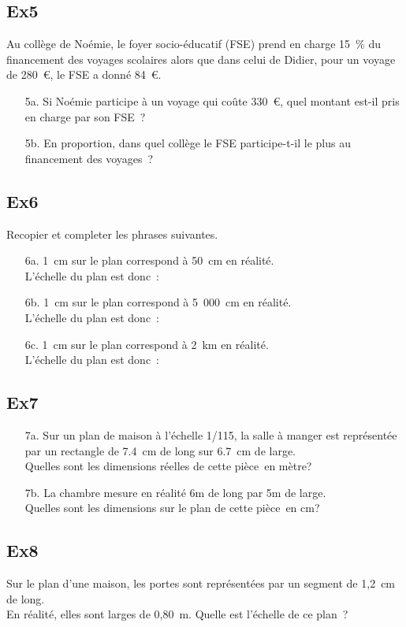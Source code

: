 \documentclass[12pt]{article}
\begin{document}
\begin{multicols}{2}
\subsection*{Ex5}
 Au collège de Noémie, le foyer socio-éducatif (FSE) prend en charge 15 \% du financement des voyages scolaires alors que dans celui de Didier, pour un voyage de 280 \euro, le FSE a donné 84 \euro.

\begin{itemize}
\item[5a.] Si Noémie participe à un voyage qui coûte 330 \euro, quel montant est-il pris en charge par son FSE ?
\item[5b.] En proportion, dans quel collège le FSE participe-t-il le plus au financement des voyages ?
\end{itemize}

\subsection*{Ex6}
Recopier et completer les phrases suivantes.
\begin{itemize}
\item[6a.] 1 cm sur le plan correspond à 50 cm en réalité.\\
L’échelle du plan est donc : 
\item[6b.] 1 cm sur le plan correspond à 5 000 cm en réalité. \\
L’échelle du plan est donc : 
\item[6c.] 1 cm sur le plan correspond à 2 km en réalité.\\
L’échelle du plan est donc : 
\end{itemize}
\end{multicols}
\begin{multicols}{2}
\subsection*{Ex7}
\begin{itemize}
\item[7a.] Sur un plan de maison à l’échelle 1/115, la salle à manger est représentée par un rectangle de 7.4 cm de long sur 6.7 cm de large. \\
Quelles sont les dimensions réelles de cette pièce en mètre?
\item[7b.] La chambre mesure en réalité 6m de long par 5m de large. \\
Quelles sont les dimensions sur le plan de cette pièce en cm?
\end{itemize}

\subsection*{Ex8}
Sur le plan d'une maison, les portes sont représentées par un segment de 1,2 cm de long. \\
En réalité, elles sont larges de 0,80 m. Quelle est l'échelle de ce plan ?
\end{multicols}
\end{document}
